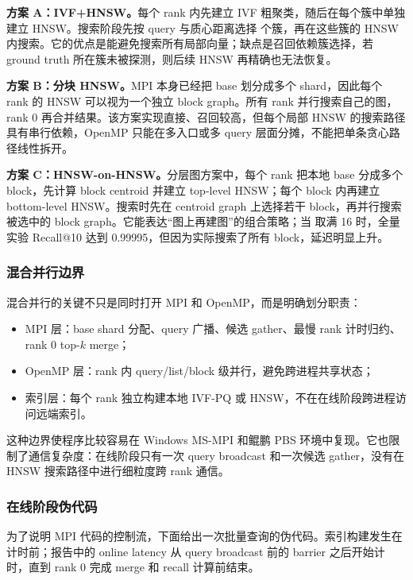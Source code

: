 \documentclass[a4paper,11pt,UTF8]{ctexart}
\newcommand{\code}[1]{\texttt{\detokenize{#1}}}
\begin{document}
\textbf{方案 A：IVF+HNSW。}每个 rank 内先建立 IVF 粗聚类，随后在每个簇中单独建立 HNSW。搜索阶段先按 query 与质心距离选择 \code{nprobe} 个簇，再在这些簇的 HNSW 内搜索。它的优点是能避免搜索所有局部向量；缺点是召回依赖簇选择，若 ground truth 所在簇未被探测，则后续 HNSW 再精确也无法恢复。

\textbf{方案 B：分块 HNSW。}MPI 本身已经把 base 划分成多个 shard，因此每个 rank 的 HNSW 可以视为一个独立 block graph。所有 rank 并行搜索自己的图，rank 0 再合并结果。该方案实现直接、召回较高，但每个局部 HNSW 的搜索路径具有串行依赖，OpenMP 只能在多入口或多 query 层面分摊，不能把单条贪心路径线性拆开。

\textbf{方案 C：HNSW-on-HNSW。}分层图方案中，每个 rank 把本地 base 分成多个 block，先计算 block centroid 并建立 top-level HNSW；每个 block 内再建立 bottom-level HNSW。搜索时先在 centroid graph 上选择若干 block，再并行搜索被选中的 block graph。它能表达“图上再建图”的组合策略；当 \code{nprobe_blocks} 取满 16 时，全量实验 Recall@10 达到 0.99995，但因为实际搜索了所有 block，延迟明显上升。

\subsubsection{混合并行边界}

混合并行的关键不只是同时打开 MPI 和 OpenMP，而是明确划分职责：
\begin{itemize}
  \item MPI 层：base shard 分配、query 广播、候选 gather、最慢 rank 计时归约、rank 0 top-$k$ merge；
  \item OpenMP 层：rank 内 query/list/block 级并行，避免跨进程共享状态；
  \item 索引层：每个 rank 独立构建本地 IVF-PQ 或 HNSW，不在在线阶段跨进程访问远端索引。
\end{itemize}

这种边界使程序比较容易在 Windows MS-MPI 和鲲鹏 PBS 环境中复现。它也限制了通信复杂度：在线阶段只有一次 query broadcast 和一次候选 gather，没有在 HNSW 搜索路径中进行细粒度跨 rank 通信。

\subsubsection{在线阶段伪代码}

为了说明 MPI 代码的控制流，下面给出一次批量查询的伪代码。索引构建发生在计时前；报告中的 online latency 从 query broadcast 前的 barrier 之后开始计时，直到 rank 0 完成 merge 和 recall 计算前结束。
\end{document}
